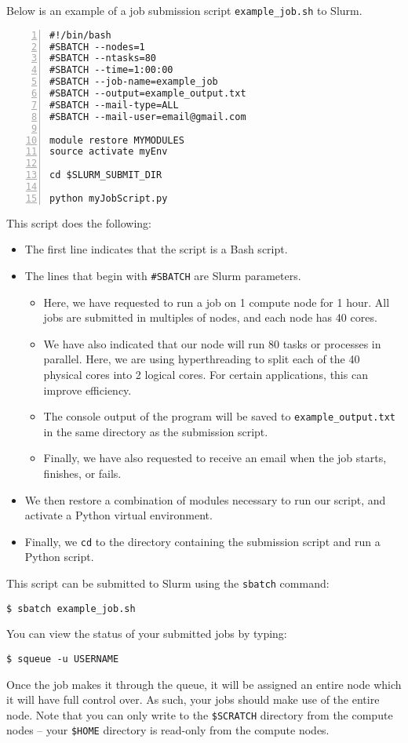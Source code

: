 \documentclass[12pt]{article}
\begin{document}
Below is an example of a job submission script \texttt{example\_job.sh} to Slurm.

\begin{lstlisting}[numbers=left]
#!/bin/bash
#SBATCH --nodes=1
#SBATCH --ntasks=80
#SBATCH --time=1:00:00
#SBATCH --job-name=example_job
#SBATCH --output=example_output.txt
#SBATCH --mail-type=ALL
#SBATCH --mail-user=email@gmail.com

module restore MYMODULES
source activate myEnv

cd $SLURM_SUBMIT_DIR

python myJobScript.py
\end{lstlisting}
This script does the following:
\begin{itemize}
\item The first line indicates that the script is a Bash script.
\item The lines that begin with \texttt{\#SBATCH} are Slurm parameters.
\begin{itemize}
	\item Here, we have requested to run a job on 1 compute node for 1 hour. All jobs are submitted in multiples of nodes, and each node has 40 cores.
	\item We have also indicated that our node will run 80 tasks or processes in parallel. Here, we are using hyperthreading to split each of the 40 physical cores into 2 logical cores. For certain applications, this can improve efficiency.
	\item The console output of the program will be saved to \texttt{example\_output.txt} in the same directory as the submission script.
	\item Finally, we have also requested to receive an email when the job starts, finishes, or fails.
\end{itemize}
\item We then restore a combination of modules necessary to run our script, and activate a Python virtual environment.
\item Finally, we \texttt{cd} to the directory containing the submission script and run a Python script.
\end{itemize}
This script can be submitted to Slurm using the \texttt{sbatch} command:
\begin{lstlisting}
$ sbatch example_job.sh
\end{lstlisting}
You can view the status of your submitted jobs by typing:
\begin{lstlisting}
$ squeue -u USERNAME
\end{lstlisting}
Once the job makes it through the queue, it will be assigned an entire node which it will have full control over. As such, your jobs should make use of the entire node. Note that you can only write to the \texttt{\$SCRATCH} directory from the compute nodes -- your \texttt{\$HOME} directory is read-only from the compute nodes.
\end{document}
